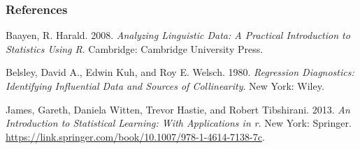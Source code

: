 \documentclass[
  10pt,
  letterpaper]{article}
\newlength{\cslhangindent}
\newlength{\cslentryspacingunit} %
\newenvironment{CSLReferences}[2] %
 {%
  \setlength{\parindent}{0pt}
  \ifodd #1
  \let\oldpar\par
  \def\par{\hangindent=\cslhangindent\oldpar}
  \fi
  \setlength{\parskip}{#2\cslentryspacingunit}
 }%
 {}
\begin{document}
\hypertarget{references}{%
\subsubsection{References}\label{references}}

\hypertarget{refs}{}
\begin{CSLReferences}{1}{0}
\leavevmode{}%
Baayen, R. Harald. 2008. \emph{Analyzing Linguistic Data: A Practical
Introduction to Statistics Using {R}}. Cambridge: Cambridge University
Press.

\leavevmode{}%
Belsley, David A., Edwin Kuh, and Roy E. Welsch. 1980. \emph{Regression
Diagnostics: Identifying Influential Data and Sources of Collinearity}.
New York: Wiley.

\leavevmode{}%
James, Gareth, Daniela Witten, Trevor Hastie, and Robert Tibshirani.
2013. \emph{An Introduction to Statistical Learning: With Applications
in \emph{r}}. New York: Springer.
\url{https://link.springer.com/book/10.1007/978-1-4614-7138-7c}.

\end{CSLReferences}
\end{document}
